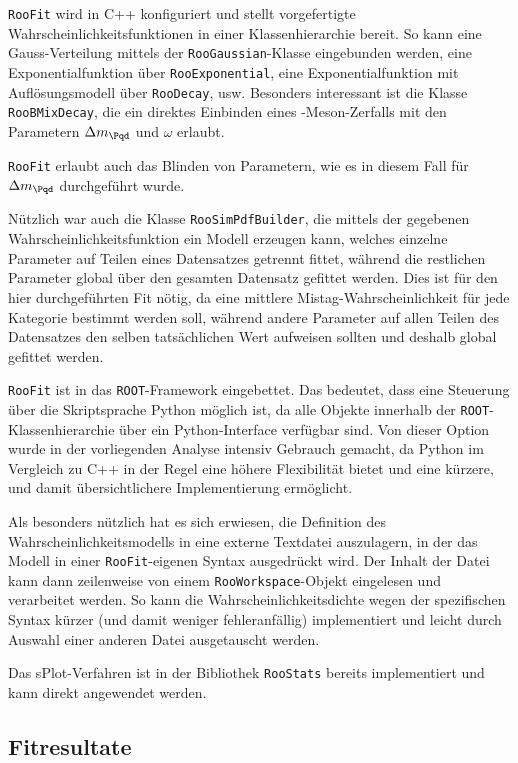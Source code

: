 \texttt{RooFit} wird in C++ konfiguriert und stellt vorgefertigte Wahrscheinlichkeitsfunktionen in einer Klassenhierarchie bereit.
So kann eine Gauss-Verteilung mittels der \texttt{RooGaussian}-Klasse eingebunden werden, eine Exponentialfunktion über \texttt{RooExponential}, eine Exponentialfunktion mit Auflösungsmodell über \texttt{RooDecay}, usw.
Besonders interessant ist die Klasse \texttt{RooBMixDecay}, die ein direktes Einbinden eines \PB-Meson-Zerfalls mit den Parametern $\difference{m_{\Pqd}}$ und $ω$ erlaubt.

\texttt{RooFit} erlaubt auch das Blinden von Parametern, wie es in diesem Fall für $\difference{m_{\Pqd}}$ durchgeführt wurde.

Nützlich war auch die Klasse \texttt{RooSimPdfBuilder}, die mittels der gegebenen Wahrscheinlichkeitsfunktion ein Modell erzeugen kann, welches einzelne Parameter auf Teilen eines Datensatzes getrennt fittet, während die restlichen Parameter global über den gesamten Datensatz gefittet werden.
Dies ist für den hier durchgeführten Fit nötig, da eine mittlere Mistag-Wahrscheinlichkeit für jede Kategorie bestimmt werden soll, während andere Parameter auf allen Teilen des Datensatzes den selben tatsächlichen Wert aufweisen sollten und deshalb global gefittet werden.

\texttt{RooFit} ist in das \texttt{ROOT}-Framework eingebettet.
Das bedeutet, dass eine Steuerung über die Skriptsprache Python möglich ist, da alle Objekte innerhalb der \texttt{ROOT}-Klassenhierarchie über ein Python-Interface verfügbar sind.
Von dieser Option wurde in der vorliegenden Analyse intensiv Gebrauch gemacht, da Python im Vergleich zu C++ in der Regel eine höhere Flexibilität bietet und eine kürzere, und damit übersichtlichere Implementierung ermöglicht.

Als besonders nützlich hat es sich erwiesen, die Definition des Wahrscheinlichkeitsmodells in eine externe Textdatei auszulagern, in der das Modell in einer \texttt{RooFit}-eigenen Syntax ausgedrückt wird.
Der Inhalt der Datei kann dann zeilenweise von einem \texttt{RooWorkspace}-Objekt eingelesen und verarbeitet werden.
So kann die Wahrscheinlichkeitsdichte wegen der spezifischen Syntax kürzer (und damit weniger fehleranfällig) implementiert und leicht durch Auswahl einer anderen Datei ausgetauscht werden.

Das sPlot-Verfahren ist in der Bibliothek \texttt{RooStats} bereits implementiert und kann direkt angewendet werden.

\subsection{Fitresultate}

